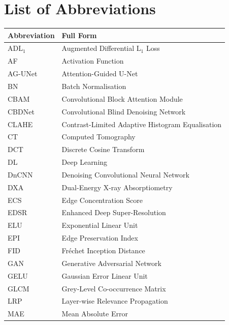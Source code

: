 
\chapter*{List of Abbreviations}
\thispagestyle{plain}

\begin{longtable}{@{}p{3.5cm}p{10cm}@{}}
  \toprule
  \textbf{Abbreviation} & \textbf{Full Form} \\
  \midrule
  \endhead
  \bottomrule
  \endfoot

  ADL$_1$  & Augmented Differential L$_1$ Loss \\
  AF       & Activation Function \\
  AG-UNet  & Attention-Guided U-Net \\
  BN       & Batch Normalisation \\
  CBAM     & Convolutional Block Attention Module \\
  CBDNet   & Convolutional Blind Denoising Network \\
  CLAHE    & Contrast-Limited Adaptive Histogram Equalisation \\
  CT       & Computed Tomography \\
  DCT      & Discrete Cosine Transform \\
  DL       & Deep Learning \\
  DnCNN    & Denoising Convolutional Neural Network \\
  DXA      & Dual-Energy X-ray Absorptiometry \\
  ECS      & Edge Concentration Score \\
  EDSR     & Enhanced Deep Super-Resolution \\
  ELU      & Exponential Linear Unit \\
  EPI      & Edge Preservation Index \\
  FID      & Fréchet Inception Distance \\
  GAN      & Generative Adversarial Network \\
  GELU     & Gaussian Error Linear Unit \\
  GLCM     & Grey-Level Co-occurrence Matrix \\
  LRP      & Layer-wise Relevance Propagation \\
  MAE      & Mean Absolute Error \\

\end{longtable}
